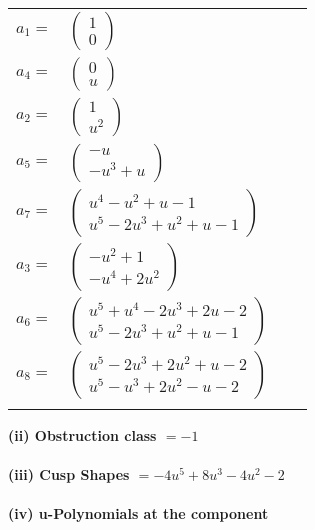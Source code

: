 \documentclass[1p]{elsarticle_modified}
\theoremstyle{definition}
\begin{document}
\begin{tabular}{m{7pt} m{180pt} m{7pt} m{180pt} }
\flushright $a_{1}=$&$\begin{pmatrix}1\\0\end{pmatrix}$ \\
\flushright $a_{4}=$&$\begin{pmatrix}0\\u\end{pmatrix}$ \\
\flushright $a_{2}=$&$\begin{pmatrix}1\\u^2\end{pmatrix}$ \\
\flushright $a_{5}=$&$\begin{pmatrix}- u\\- u^3+u\end{pmatrix}$ \\
\flushright $a_{7}=$&$\begin{pmatrix}u^4- u^2+u-1\\u^5-2 u^3+u^2+u-1\end{pmatrix}$ \\
\flushright $a_{3}=$&$\begin{pmatrix}- u^2+1\\- u^4+2 u^2\end{pmatrix}$ \\
\flushright $a_{6}=$&$\begin{pmatrix}u^5+u^4-2 u^3+2 u-2\\u^5-2 u^3+u^2+u-1\end{pmatrix}$ \\
\flushright $a_{8}=$&$\begin{pmatrix}u^5-2 u^3+2 u^2+u-2\\u^5- u^3+2 u^2- u-2\end{pmatrix}$\\&\end{tabular}
\flushleft \textbf{(ii) Obstruction class $= -1$}\\~\\
\flushleft \textbf{(iii) Cusp Shapes $= -4 u^5+8 u^3-4 u^2-2$}\\~\\
\newpage\renewcommand{\arraystretch}{1}
\flushleft \textbf{(iv) u-Polynomials at the component}\newline \\
\end{document}
